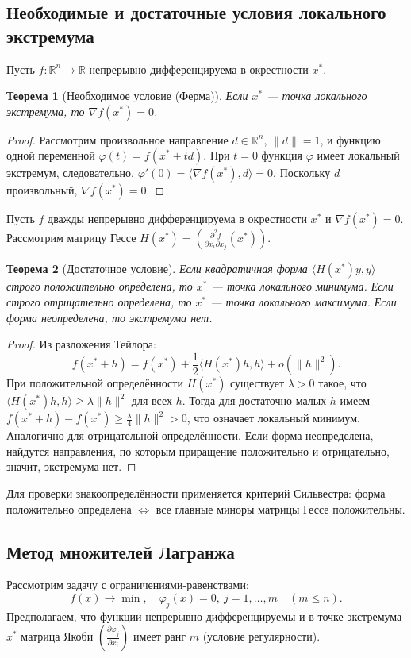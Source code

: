 \documentclass{article}
\theoremstyle{plain}
\newtheorem{theorem}{Теорема}[section]
\begin{document}
\subsection{Необходимые и достаточные условия локального экстремума}
Пусть $f: \mathbb{R}^n \to \mathbb{R}$ непрерывно дифференцируема в окрестности $x^*$.

\begin{theorem}[Необходимое условие (Ферма)]
Если $x^*$ — точка локального экстремума, то $\nabla f(x^*) = 0$.
\end{theorem}
\begin{proof}
Рассмотрим произвольное направление $d \in \mathbb{R}^n$, $\|d\|=1$, и функцию одной переменной $\varphi(t) = f(x^* + t d)$. При $t=0$ функция $\varphi$ имеет локальный экстремум, следовательно, $\varphi'(0) = \langle \nabla f(x^*), d \rangle = 0$. Поскольку $d$ произвольный, $\nabla f(x^*) = 0$.
\end{proof}

Пусть $f$ дважды непрерывно дифференцируема в окрестности $x^*$ и $\nabla f(x^*) = 0$. Рассмотрим матрицу Гессе $H(x^*) = \left(\frac{\partial^2 f}{\partial x_i \partial x_j}(x^*)\right)$.

\begin{theorem}[Достаточное условие]
Если квадратичная форма $\langle H(x^*)y, y \rangle$ строго положительно определена, то $x^*$ — точка локального минимума. Если строго отрицательно определена, то $x^*$ — точка локального максимума. Если форма неопределена, то экстремума нет.
\end{theorem}
\begin{proof}
Из разложения Тейлора:
\[
f(x^*+h) = f(x^*) + \frac{1}{2}\langle H(x^*)h, h\rangle + o(\|h\|^2).
\]
При положительной определённости $H(x^*)$ существует $\lambda > 0$ такое, что $\langle H(x^*)h, h\rangle \ge \lambda \|h\|^2$ для всех $h$. Тогда для достаточно малых $h$ имеем $f(x^*+h) - f(x^*) \ge \frac{\lambda}{4}\|h\|^2 > 0$, что означает локальный минимум. Аналогично для отрицательной определённости. Если форма неопределена, найдутся направления, по которым приращение положительно и отрицательно, значит, экстремума нет.
\end{proof}

Для проверки знакоопределённости применяется критерий Сильвестра: форма положительно определена $\iff$ все главные миноры матрицы Гессе положительны.

\subsection{Метод множителей Лагранжа}
Рассмотрим задачу с ограничениями-равенствами:
\[
f(x) \to \min,\quad \varphi_j(x)=0,\ j=1,\dots,m \quad (m \le n).
\]
Предполагаем, что функции непрерывно дифференцируемы и в точке экстремума $x^*$ матрица Якоби $\left(\frac{\partial \varphi_j}{\partial x_i}\right)$ имеет ранг $m$ (условие регулярности).
\end{document}
